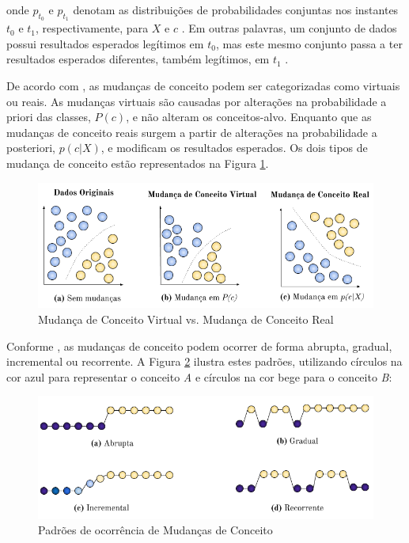 \documentclass[msc, classic, a4paper]{ufbathesis}
\begin{document}
onde $p_{t_0}$ e $p_{t_1}$ denotam as distribuições de probabilidades conjuntas nos instantes $t_0$ e $t_1$, respectivamente,
para $X$ e $c$ \cite{Gama:2014:SCD:2597757.2523813}.
Em outras palavras, um conjunto de dados possui resultados esperados legítimos em $t_0$, mas este mesmo conjunto passa a ter resultados esperados diferentes, também legítimos, em $t_1$ \cite{Kolter:2007:DWM:1314498.1390333}.

De acordo com , as mudanças de conceito podem ser categorizadas como virtuais ou reais.
As mudanças virtuais são causadas por alterações na probabilidade a priori das classes, $P(c)$, e não alteram os conceitos-alvo.
Enquanto que as mudanças de conceito reais surgem a partir de alterações na probabilidade a posteriori, $p(c|X)$, e modificam os resultados esperados.
Os dois tipos de mudança de conceito estão representados na Figura \ref{fig:real_and_virtual_concept_drift}.

\begin{figure}[H]
\begin{center}
    \includegraphics[scale=0.8]{imagens/concept_drift.png}
    \caption{Mudança de Conceito Virtual vs. Mudança de Conceito Real}
    \label{fig:real_and_virtual_concept_drift}
\end{center}
\end{figure}

Conforme , as mudanças de conceito podem ocorrer de forma abrupta, gradual, incremental ou recorrente.
A Figura \ref{fig:concept_drift_patterns} ilustra estes padrões,
utilizando círculos na cor azul para representar o conceito \textit{A} e círculos na cor bege para o conceito \textit{B}:

\begin{figure}[H]
\begin{center}
    \includegraphics[scale=0.8]{imagens/concept_drift_patterns.png}
    \caption{Padrões de ocorrência de Mudanças de Conceito}
    \label{fig:concept_drift_patterns}
\end{center}
\end{figure}
\end{document}
